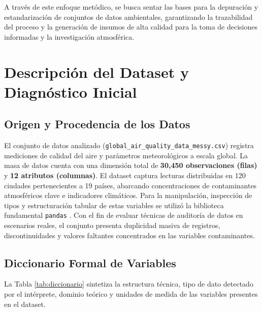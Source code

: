 \documentclass[journal,twocolumn,spanish]{IEEEtran}
\begin{document}
A través de este enfoque metódico, se busca sentar las bases para la depuración y estandarización de conjuntos de datos ambientales, garantizando la trazabilidad del proceso y la generación de insumos de alta calidad para la toma de decisiones informadas y la investigación atmosférica.

\section{Descripción del Dataset y Diagnóstico Inicial}

\subsection{Origen y Procedencia de los Datos}
El conjunto de datos analizado (\texttt{global\_air\_quality\_data\_messy.csv}) registra mediciones de calidad del aire y parámetros meteorológicos a escala global. La masa de datos cuenta con una dimensión total de \textbf{30,450 observaciones (filas)} y \textbf{12 atributos (columnas)}. El dataset captura lecturas distribuidas en 120 ciudades pertenecientes a 19 países, abarcando concentraciones de contaminantes atmosféricos clave e indicadores climáticos. Para la manipulación, inspección de tipos y estructuración tabular de estas variables se utilizó la biblioteca fundamental \texttt{pandas} \cite{McKinney2010}. Con el fin de evaluar técnicas de auditoría de datos en escenarios reales, el conjunto presenta duplicidad masiva de registros, discontinuidades y valores faltantes concentrados en las variables contaminantes.

\subsection{Diccionario Formal de Variables}
La Tabla \ref{tab:diccionario} sintetiza la estructura técnica, tipo de dato detectado por el intérprete, dominio teórico y unidades de medida de las variables presentes en el dataset.
\end{document}
